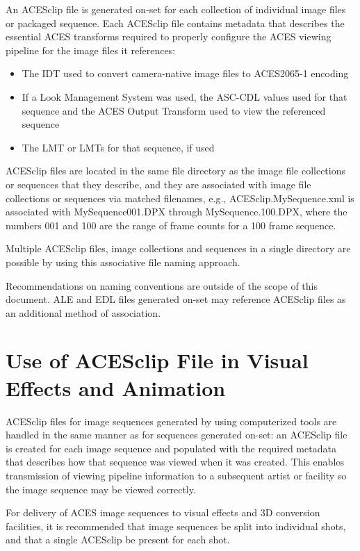 An ACESclip file is generated on-set for each collection of individual image files or packaged sequence. Each ACESclip file contains metadata that describes the essential ACES transforms required to properly configure the ACES viewing pipeline for the image files it references:

\begin{itemize}
	\item The IDT used to convert camera-native image files to ACES2065-1 encoding
	\item If a Look Management System was used, the ASC-CDL values used for that sequence and the ACES Output Transform used to view the referenced sequence
	\item The LMT or LMTs for that sequence, if used	
\end{itemize}

ACESclip files are located in the same file directory as the image file collections or sequences that they describe, and they are associated with image file collections or sequences via matched filenames, e.g., ACESclip.MySequence.xml is associated with MySequence001.DPX through MySequence.100.DPX, where the numbers 001 and 100 are the range of frame counts for a 100 frame sequence.

Multiple ACESclip files, image collections and sequences in a single directory are possible by using this associative file naming approach.

Recommendations on naming conventions are outside of the scope of this document.
ALE and EDL files generated on-set may reference ACESclip files as an additional method of association.

\section{Use of ACESclip File in Visual Effects and Animation}
ACESclip files for image sequences generated by using computerized tools are handled in the same manner as for sequences generated on-set: an ACESclip file is created for each image sequence and populated with the required metadata that describes how that sequence was viewed when it was created.  This enables transmission of viewing pipeline information to a subsequent artist or facility so the image sequence may be viewed correctly.

For delivery of ACES image sequences to visual effects and 3D conversion facilities, it is recommended that image sequences be split into individual shots, and that a single ACESclip be present for each shot.

